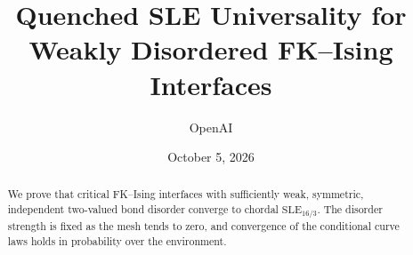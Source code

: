 \documentclass[11pt]{article}
\title{Quenched SLE Universality for Weakly Disordered FK--Ising Interfaces}
\author{OpenAI}
\date{October 5, 2026}
\numberwithin{equation}{section}
\theoremstyle{definition}
\theoremstyle{remark}
\newcommand{\SLE}{\mathrm{SLE}}
\begin{document}
\maketitle
\begin{abstract}
We prove that critical FK--Ising interfaces with sufficiently weak, symmetric,
independent two-valued bond disorder converge to chordal $\SLE_{16/3}$.
The disorder strength is fixed as the mesh tends to zero, and convergence of
the conditional curve laws holds in probability over the environment.
\end{abstract}
\tableofcontents









\end{document}
